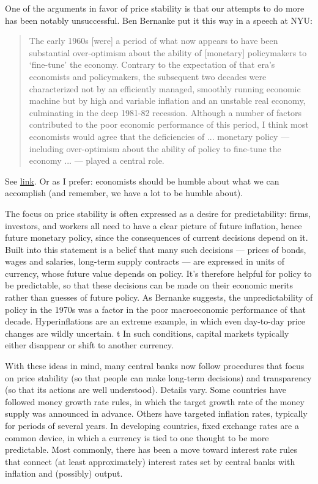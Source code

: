 \documentclass[letterpaper,12pt]{article}
\begin{document}
One of the arguments in favor of price stability is that
our attempts to do more
has been notably unsuccessful.
Ben Bernanke put it this way in a speech at NYU:
%
\begin{quote}
The early 1960s [were] a period of what now appears to have been
substantial over-optimism about the ability of [monetary]
policymakers to `fine-tune' the economy. Contrary to the expectation
of that era's economists and policymakers, the subsequent two
decades were characterized not by an efficiently managed, smoothly
running economic machine but by high and variable inflation and an
unstable real economy, culminating in the deep 1981-82 recession.
Although a number of factors contributed to the poor economic
performance of this period, I think most economists would agree that
the deficiencies of ... monetary policy --- including over-optimism
about the ability of policy to fine-tune the economy ... --- played
a central role.
\end{quote}
%
See
\href{http://www.federalreserve.gov/boarddocs/Speeches/2003/20030203/default.htm}
{link}.
Or as I prefer:  economists should be humble about what we can
accomplish (and remember, we have a lot to be humble about).


The focus on price stability is often expressed as
a desire for predictability:
firms, investors, and workers all need to have a clear picture
of future inflation, hence future monetary policy,
since the consequences of current decisions depend on it.
Built into this statement is a belief that many such decisions
--- prices of bonds, wages and salaries, long-term supply contracts ---
are expressed in units of currency, whose future value depends
on policy.
It's therefore helpful for policy to be predictable, so that these
decisions can be made on their economic merits
rather than guesses of future policy.
As Bernanke suggests,
the unpredictability of policy in the 1970s was a factor in
the poor macroeconomic performance of that decade.
Hyperinflations are an extreme example,
in which even day-to-day price changes are wildly uncertain.  t
In such conditions, capital markets typically either disappear
or shift to another currency.

With these ideas in mind,
many central banks now follow procedures that focus on price
stability (so that people can make long-term decisions)
and transparency
(so that its actions are well understood).
Details vary.
Some  countries have followed money growth rate rules,
in which the target growth rate of the money supply was announced in advance. Others have targeted inflation rates, typically for periods of
several years.
In developing countries, fixed exchange rates are a common device,
in which a currency is tied to one thought to be more predictable.
Most commonly, there has been a move toward interest rate rules
that connect (at least approximately)
interest rates set by central banks with inflation and (possibly) output.
\end{document}
